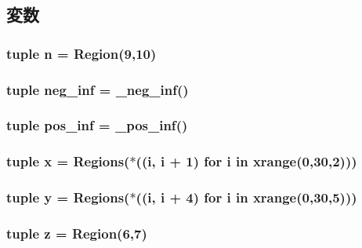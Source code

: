 \subsection{変数}
\hypertarget{namespacem5_1_1util_1_1region_aa804450d097df684fcc75a2916504c3f}{
\subsubsection[{n}]{\setlength{\rightskip}{0pt plus 5cm}tuple {\bf n} = {\bf Region}(9,10)}}
\label{namespacem5_1_1util_1_1region_aa804450d097df684fcc75a2916504c3f}
\hypertarget{namespacem5_1_1util_1_1region_a52a715d427fb475b545ea40b2206bce6}{
\subsubsection[{neg\_\-inf}]{\setlength{\rightskip}{0pt plus 5cm}tuple {\bf neg\_\-inf} = {\bf \_\-neg\_\-inf}()}}
\label{namespacem5_1_1util_1_1region_a52a715d427fb475b545ea40b2206bce6}
\hypertarget{namespacem5_1_1util_1_1region_a2a1e9ac365d454cdb95f4f29f14fcdaf}{
\subsubsection[{pos\_\-inf}]{\setlength{\rightskip}{0pt plus 5cm}tuple {\bf pos\_\-inf} = {\bf \_\-pos\_\-inf}()}}
\label{namespacem5_1_1util_1_1region_a2a1e9ac365d454cdb95f4f29f14fcdaf}
\hypertarget{namespacem5_1_1util_1_1region_a7a74e6f2f6355f34b63513f77c839a9e}{
\subsubsection[{x}]{\setlength{\rightskip}{0pt plus 5cm}tuple {\bf x} = {\bf Regions}($\ast$((i, i + 1) for i in xrange(0,30,2)))}}
\label{namespacem5_1_1util_1_1region_a7a74e6f2f6355f34b63513f77c839a9e}
\hypertarget{namespacem5_1_1util_1_1region_addbecca6e1a6301f3c92a77b235c1a51}{
\subsubsection[{y}]{\setlength{\rightskip}{0pt plus 5cm}tuple {\bf y} = {\bf Regions}($\ast$((i, i + 4) for i in xrange(0,30,5)))}}
\label{namespacem5_1_1util_1_1region_addbecca6e1a6301f3c92a77b235c1a51}
\hypertarget{namespacem5_1_1util_1_1region_a662153d49896c6e46645d171ec8e5dba}{
\subsubsection[{z}]{\setlength{\rightskip}{0pt plus 5cm}tuple {\bf z} = {\bf Region}(6,7)}}
\label{namespacem5_1_1util_1_1region_a662153d49896c6e46645d171ec8e5dba}
